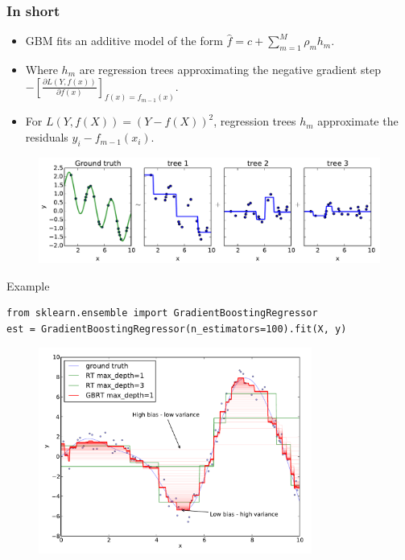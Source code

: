 \documentclass{beamer}
\begin{document}
\begin{frame}
    \frametitle{In short}
    \begin{itemize}
    \item GBM fits an additive model of the form
    $\hat{f} =  c + \sum_{m=1}^M \rho_m h_m.$

    \item Where $h_m$ are regression trees approximating
          the negative gradient step
          $-\left[ \frac{\partial L(Y,f(x))}{\partial f(x)} \right]_{f(x) = f_{m-1}(x)}$.

    \item For $L(Y,f(X)) = (Y-f(X))^2$, regression trees $h_m$ approximate the residuals $y_i -f_{m-1}(x_i)$.
    \end{itemize}

  \begin{figure}
     \centering
     \includegraphics[width=\textwidth]{./figures/residual_fitting_2.pdf}
  \end{figure}
\end{frame}

\begin{frame}[fragile]{Example}

    \begin{verbatim}
from sklearn.ensemble import GradientBoostingRegressor
est = GradientBoostingRegressor(n_estimators=100).fit(X, y)
    \end{verbatim}

   \begin{figure}
     \centering
       \includegraphics[width=0.8\textwidth]{figures/func_approx3.pdf}
   \end{figure}

\end{frame}
\end{document}
